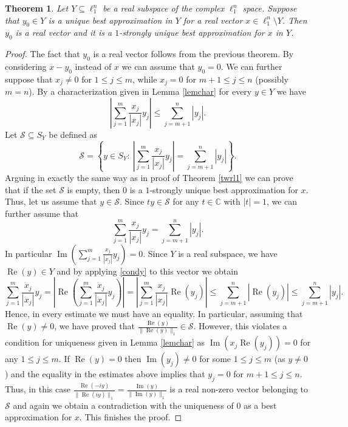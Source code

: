 \documentclass[12pt, reqno]{amsart}
\newtheorem{twr}{Theorem}[section]
\theoremstyle{definition}
\theoremstyle{remark}
\numberwithin{equation}{section}
\DeclareMathOperator{\re}{Re}
\DeclareMathOperator{\im}{Im}
\begin{document}
\begin{twr}
\label{twrl12}
Let $Y \subseteq \ell_{1}^n$ be a real subspace of the complex $\ell_1^n$ space. Suppose that $y_0 \in Y$ is a unique best approximation in $Y$ for a real vector $x \in \ell_{1}^n \setminus Y$. Then $y_0$ is a real vector and it is a $1$-strongly unique best approximation for $x$ in $Y$.
\end{twr}
\begin{proof}
The fact that $y_0$ is a real vector follows from the previous theorem. By considering $x-y_0$ instead of $x$ we can assume that $y_0=0$. We can further suppose that $x_j \neq 0$ for $1 \leq j \leq m$, while $x_j=0$ for $m+1 \leq j \leq n$ (possibly $m=n$). By a characterization given in Lemma \ref{lemchar} for every $y \in Y$ we have
\begin{equation}
\label{condy}
\left | \sum_{j=1}^{m} \frac{x_j}{|x_j|} y_j \right | \leq \sum_{j=m+1}^{n} |y_j|.
\end{equation}
Let $\mathcal{S} \subseteq S_Y$ be defined as
$$\mathcal{S} = \left \{ y \in S_Y: \  \left | \sum_{j=1}^{m} \frac{x_j}{|x_j|} y_j \right | = \sum_{j=m+1}^{n} |y_j| \right \}.$$
Arguing in exactly the same way as in proof of Theorem \ref{twrl1} we can prove that if the set $\mathcal{S}$ is empty, then $0$ is a $1$-strongly unique best approximation for $x$. Thus, let us assume that $y \in \mathcal{S}$. Since $ty \in \mathcal{S}$ for any $t \in \mathbb{C}$ with $|t|=1$, we can further assume that
$$\sum_{j=1}^{m} \frac{x_j}{|x_j|} y_j  = \sum_{j=m+1}^{n} |y_j|.$$
In particular $\im \left ( \sum_{j=1}^{m} \frac{x_j}{|x_j|} y_j \right ) = 0$. Since $Y$ is a real subspace, we have $\re(y) \in Y$ and by applying \eqref{condy} to this vector we obtain
$$ \sum_{j=1}^{m} \frac{x_j}{|x_j|} y_j = \left | \re \left ( \sum_{j=1}^{m} \frac{x_j}{|x_j|} y_j  \right ) \right | = \left | \sum_{j=1}^{m} \frac{x_j}{|x_j|} \re(y_j) \right | \leq \sum_{j=m+1}^{n} |\re(y_j)| \leq \sum_{j=m+1}^{n} |y_j|.$$
Hence, in every estimate we must have an equality. In particular, assuming that $\re(y) \neq 0$, we have proved that $\frac{\re(y)}{\|\re(y)\|_1} \in \mathcal{S}$. However, this violates a condition for uniqueness given in Lemma \ref{lemchar} as $\im(x_j\re(y_j)) = 0$ for any $1 \leq j \leq m$. If $\re(y)=0$ then $\im(y_j) \neq 0$ for some $1 \leq j \leq m$ (as $y \neq 0$) and the equality in the estimates above implies that $y_j=0$ for $m+1 \leq j \leq n$. Thus, in this case $\frac{\re(-iy)}{\|\re(iy)\|_1}=\frac{\im(y)}{\|\im(y)\|_1}$ is a real non-zero vector belonging to $\mathcal{S}$ and again we obtain a contradiction with the uniqueness of $0$ as a best approximation for $x$. This finishes the proof.
\end{proof}
\end{document}
